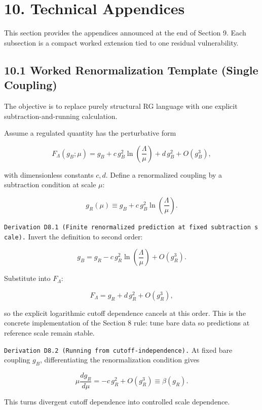 \documentclass[
]{article}
\begin{document}
\hypertarget{technical-appendices}{%
\section{10. Technical Appendices}\label{technical-appendices}}

This section provides the appendices announced at the end of Section 9.
Each subsection is a compact worked extension tied to one residual
vulnerability.

\hypertarget{worked-renormalization-template-single-coupling}{%
\subsection{10.1 Worked Renormalization Template (Single
Coupling)}\label{worked-renormalization-template-single-coupling}}

The objective is to replace purely structural RG language with one
explicit subtraction-and-running calculation.

Assume a regulated quantity has the perturbative form

\[
F_\Lambda(g_B;\mu)
=
g_B
+c\,g_B^2\ln\!\left(\frac{\Lambda}{\mu}\right)
+d\,g_B^2
+O(g_B^3),
\]

with dimensionless constants \(c,d\). Define a renormalized coupling by
a subtraction condition at scale \(\mu\):

\[
g_R(\mu)\equiv g_B+c\,g_B^2\ln\!\left(\frac{\Lambda}{\mu}\right).
\]

\texttt{Derivation\ D8.1\ (Finite\ renormalized\ prediction\ at\ fixed\ subtraction\ scale).}
Invert the definition to second order:

\[
g_B
=
g_R-c\,g_R^2\ln\!\left(\frac{\Lambda}{\mu}\right)+O(g_R^3).
\]

Substitute into \(F_\Lambda\):

\[
F_\Lambda
=
g_R
+d\,g_R^2
+O(g_R^3),
\]

so the explicit logarithmic cutoff dependence cancels at this order.
This is the concrete implementation of the Section 8 rule: tune bare
data so predictions at reference scale remain stable.

\texttt{Derivation\ D8.2\ (Running\ from\ cutoff-independence).} At
fixed bare coupling \(g_B\), differentiating the renormalization
condition gives

\[
\mu\frac{d g_R}{d\mu}
=
-c\,g_R^2+O(g_R^3)
\equiv
\beta(g_R).
\]

This turns divergent cutoff dependence into controlled scale dependence.
\end{document}

